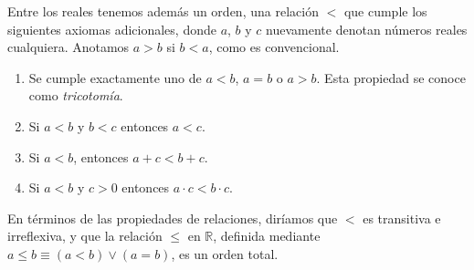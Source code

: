   Entre los reales tenemos además un orden,%
  una relación \(<\) que cumple los siguientes axiomas adicionales,
  donde \(a\), \(b\) y \(c\) nuevamente denotan números reales cualquiera.
  Anotamos \(a > b\) si \(b < a\),
  como es convencional.
  \begin{enumerate}[label=\textbf{O\arabic{*}:}, ref=O\arabic{*}]
  \item\label{Re:tricotomia}%
    Se cumple exactamente uno de \(a < b\), \(a = b\) o \(a > b\).
    Esta propiedad se conoce como \emph{tricotomía}.
  \item\label{Re:transitidad<}%
    Si \(a < b\) y \(b < c\) entonces \(a < c\).
  \item\label{Re:>+}
    Si \(a < b\),
    entonces \(a + c < b + c\).
  \item\label{Re:>*}
    Si \(a < b\) y \(c > 0\)
    entonces \(a \cdot c < b \cdot c\).
  \end{enumerate}
  En términos de las propiedades de relaciones,
  diríamos que \(<\) es transitiva e irreflexiva,%
  y que la relación \(\le\) en \(\mathbb{R}\),
  definida mediante \mbox{\(a \le b \equiv (a < b) \vee (a = b)\)},
  es un orden total.%

